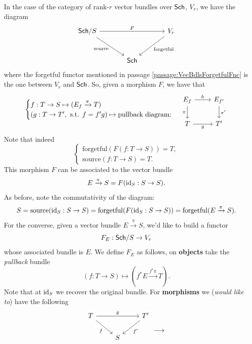 \documentclass[12pt]{memoir}
\newcounter{passage}
\begin{document}
\begin{ptcb}
    In the case of the category of rank-\(r\) vector bundles over \(\mathsf{Sch}\), \(V_r\), we have the diagram
     \[
        \begin{tikzcd}[column sep=large, row sep=large]
        \Sch/S
            \arrow[rr, "F"]
            \arrow[dr, "\text{source}"']&
        & V_r \arrow[dl, "\text{forgetful}"] \\
        & \Sch
        \end{tikzcd}
    \]
    where the forgetful functor mentioned in passage \ref{passage:VecBdlsForgetfulFnc} is the one between \(V_r\) and \(\mathsf{Sch}\). So, given a morphism \(F\), we have that 
    \[
    \begin{cases}
        f:T\to S\mapsto (E_f\xrightarrow{\pi}T)\\
        (g:T\to T',\text{ s.t. }f=f'g)\mapsto \text{pullback diagram:}
    \end{cases}
    \begin{tikzcd}
        E_f \arrow[r, "h"] \arrow[d, "\pi"'] & E_{f'} \arrow[d, "\pi'"] \\
        T \arrow[r, "g"']                    & T'                      
    \end{tikzcd}    
    \]
    Note that indeed
    \[
    \begin{cases}
        \text{forgetful}(F(f:T\to S))=T,\\
        \text{source}(f:T\to S)=T.
    \end{cases}
    \]
    This morphism \(F\) can be associated to the vector bundle 
    \[
        E\xrightarrow{\pi}S=F(\operatorname{id}_S:S\to S).
    \]
    As before, note the commutativity of the diagram:
    \[
    S=\text{source}(\operatorname{id}_S:S\to S)=\text{forgetful}(F(\operatorname{id}_S:S\to S))=\text{forgetful}(E\xrightarrow{\pi}S).
    \]
    For the converse, given a vector bundle \(E\xrightarrow{\pi}S\), we'd like to build a functor
    \[
    F_E:\mathsf{Sch}/S\to V_r
    \]
    whose associated bundle is \(E\). We define \(F_E\) as follows, on \textbf{objects} take the \emph{pullback} bundle
    \[
        (f:T\to S)\mapsto (f^\ast E\xrightarrow{f^\ast \pi} T).
    \]
    Note that at \(\operatorname{id}_S\) we recover the original bundle. For \textbf{morphisms} we (\emph{would like to}) have the following
    \[
    \begin{tikzcd}
 T\arrow[dr,"f"'] \arrow[rr,"g"] && T'\arrow[dl,"f'"] \\
& S  \\
\end{tikzcd}\longrightarrow 
\begin{tikzcd}

\end{tikzcd}\]
\end{ptcb}
\end{document}
